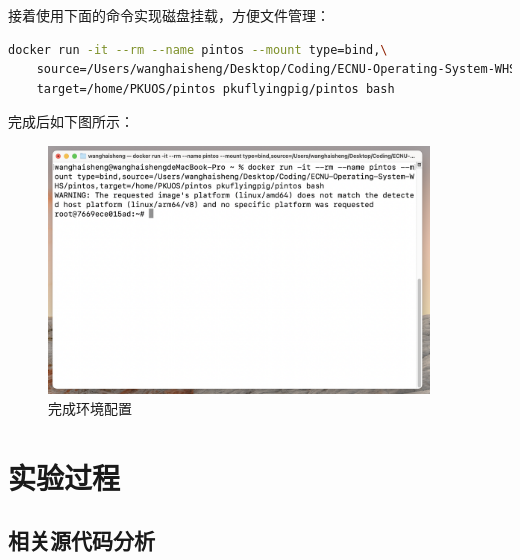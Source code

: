 \documentclass{article}
\begin{document}
接着使用下面的命令实现磁盘挂载，方便文件管理：

\begin{lstlisting}[language=Bash, title=启动Docker容器并挂载文件]
	docker run -it --rm --name pintos --mount type=bind,\
	source=/Users/wanghaisheng/Desktop/Coding/ECNU-Operating-System-WHS/pintos,\
	target=/home/PKUOS/pintos pkuflyingpig/pintos bash
\end{lstlisting}

完成后如下图所示：

\begin{figure}[H]
	\centering
	\includegraphics[width=0.9\textwidth]{img/run_docker.png}
	\caption{完成环境配置}
\end{figure}

\normalsize

\section{实验过程}

\subsection{相关源代码分析}
\end{document}

